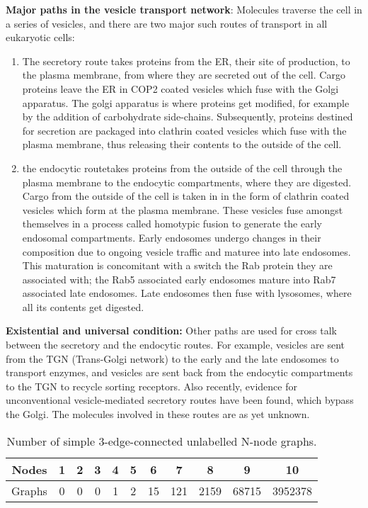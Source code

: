 \textbf{Major paths in the vesicle transport network}:
Molecules traverse the cell in a series of vesicles, and there are two major such routes of transport in all eukaryotic cells:
\begin{enumerate}
	\item The secretory route takes proteins from the ER, their site of production, to the plasma membrane, from where they are secreted out of the cell. Cargo proteins leave the ER in COP2 coated vesicles which fuse with the Golgi apparatus. The golgi apparatus is where proteins get modified, for example by the addition of carbohydrate side-chains. Subsequently, proteins destined for secretion are packaged into clathrin coated vesicles which fuse with the plasma membrane, thus releasing their contents to the outside of the cell\cite{alberts2002molecular}.
	\item the endocytic routetakes proteins from the outside of the cell through the plasma membrane to the endocytic compartments, where they are digested. Cargo from the outside of the cell is taken in in the form of clathrin coated vesicles which form at the plasma membrane. These vesicles fuse amongst themselves in a process called homotypic fusion to generate the early endosomal compartments. Early endosomes undergo changes in their composition due to ongoing vesicle traffic and maturee into late endosomes. This maturation is concomitant with a switch the Rab protein they are associated with; the Rab5 associated early endosomes mature into Rab7 associated late endosomes\cite{rink2005rab}. Late endosomes then fuse with lysosomes, where all its contents get digested\cite{pryor2009delivery}.
\end{enumerate}

\textbf{Existential and universal condition:}
Other paths are used for cross talk between the secretory and the endocytic routes. For example, vesicles are sent from the TGN (Trans-Golgi network) to the early and the late endosomes to transport enzymes, and vesicles are sent back from the endocytic compartments to the TGN to recycle sorting receptors\cite{progida2016bidirectional}. Also recently, evidence for unconventional vesicle-mediated secretory routes have been found, which bypass the Golgi. The molecules involved in these routes are as yet unknown\cite{nickel2018unconventional}. 
%

\begin{table}
	\begin{center}
		\begin{tabular}{|c|c|c|c|c|c|c|c|c|c|c|}
			\hline
			Nodes & 1 & 2 & 3 & 4 & 5 & 6 & 7 & 8 & 9 & 10 \\ \hline
			Graphs & 0 & 0 & 0 & 1 & 2 & 15 & 121 & 2159 & 68715 & 3952378 \\ 
			\hline
		\end{tabular}
		\label{tab:threec}
		\caption{Number of simple 3-edge-connected unlabelled N-node graphs.}
	\end{center}	
\end{table}

